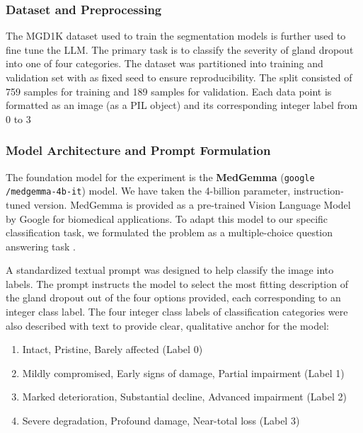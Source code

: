 \documentclass{article}
\begin{document}

\subsubsection{Dataset and Preprocessing}
The MGD1K \cite{saha2022automated} dataset used to train the segmentation models is further used to fine tune the LLM. The primary task is to classify the severity of gland dropout into one of four categories. The dataset was partitioned into training and validation set with as fixed seed to ensure reproducibility. The split consisted of 759 samples for training and 189 samples for validation. Each data point is formatted as an image (as a PIL object) and its corresponding integer label from 0 to 3 

\subsubsection{Model Architecture and Prompt Formulation}
The foundation model for the experiment is the \textbf{MedGemma} (\texttt{google /medgemma-4b-it}) model. We have taken the 4-billion parameter, instruction-tuned version. MedGemma is provided as a pre-trained Vision Language Model by Google for biomedical applications. To adapt this model to our specific classification task, we formulated the problem as a multiple-choice question answering task \cite{sellergren2025medgemma}.

A standardized textual prompt was designed to help classify the image into labels. The prompt instructs the model to select the most fitting description of the gland dropout out of the four options provided, each corresponding to an integer class label. The four integer class labels of classification categories were also described with text to provide clear, qualitative anchor for the model:

\begin{enumerate}
    \item[\textbf{A.}] Intact, Pristine, Barely affected (Label 0)
    \item[\textbf{B.}] Mildly compromised, Early signs of damage, Partial impairment (Label 1)
    \item[\textbf{C.}] Marked deterioration, Substantial decline, Advanced impairment (Label 2)
    \item[\textbf{D.}] Severe degradation, Profound damage, Near-total loss (Label 3)
\end{enumerate}
\end{document}
